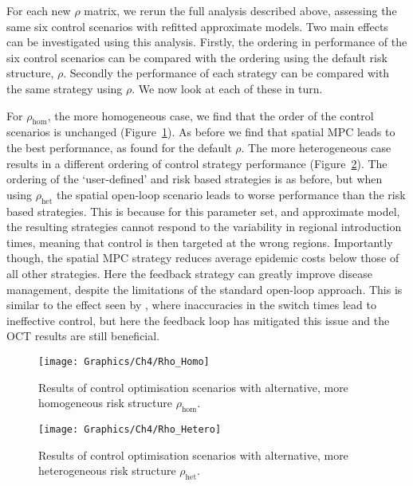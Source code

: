 For each new $\rho$ matrix, we rerun the full analysis described above, assessing the same six control scenarios with refitted approximate models. Two main effects can be investigated using this analysis. Firstly, the ordering in performance of the six control scenarios can be compared with the ordering using the default risk structure, $\rho$. Secondly the performance of each strategy can be compared with the same strategy using $\rho$. We now look at each of these in turn.

For $\rho_{\mathrm{hom}}$, the more homogeneous case, we find that the order of the control scenarios is unchanged (Figure~\ref{fig:ch4:rho_homo}). As before we find that spatial MPC leads to the best performance, as found for the default $\rho$. The more heterogeneous case results in a different ordering of control strategy performance (Figure~\ref{fig:ch4:rho_hetero}). The ordering of the `user-defined' and risk based strategies is as before, but when using $\rho_{\mathrm{het}}$ the spatial open-loop scenario leads to worse performance than the risk based strategies. This is because for this parameter set, and approximate model, the resulting strategies cannot respond to the variability in regional introduction times, meaning that control is then targeted at the wrong regions. Importantly though, the spatial MPC strategy reduces average epidemic costs below those of all other strategies. Here the feedback strategy can greatly improve disease management, despite the limitations of the standard open-loop approach. This is similar to the effect seen by \citet{forster_optimizing_2007}, where inaccuracies in the switch times lead to ineffective control, but here the feedback loop has mitigated this issue and  the OCT results are still beneficial.

\begin{figure}[h]
    \begin{center}
        \texttt{[image: Graphics/Ch4/Rho\_Homo]}
        \caption{Results of control optimisation scenarios with alternative, more homogeneous risk structure $\rho_{\mathrm{hom}}$.}
        \label{fig:ch4:rho_homo}
    \end{center}
\end{figure}

\begin{figure}[h]
    \begin{center}
        \texttt{[image: Graphics/Ch4/Rho\_Hetero]}
        \caption{Results of control optimisation scenarios with alternative, more heterogeneous risk structure $\rho_{\mathrm{het}}$.}
        \label{fig:ch4:rho_hetero}
    \end{center}
\end{figure}

